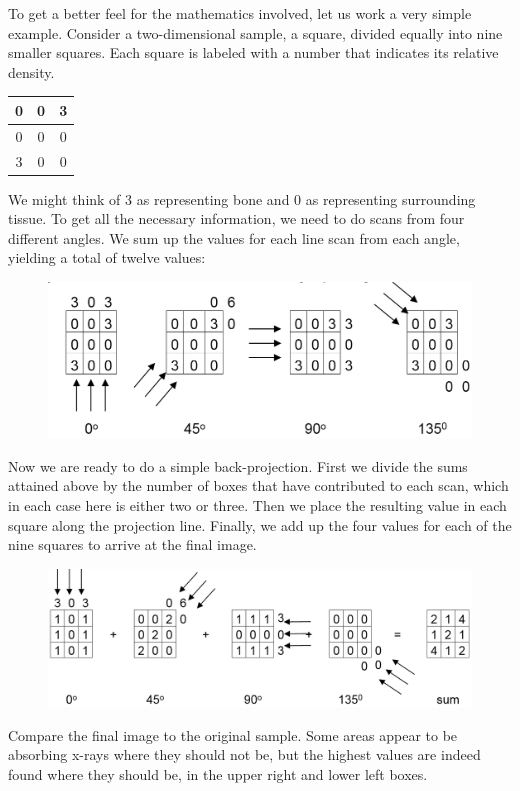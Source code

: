 To get a better feel for the mathematics involved, let us work a very simple example.  Consider a two-dimensional sample, a square, divided equally into nine smaller squares.  Each square is labeled with a number that indicates its relative density.
\begin{table}[!h]
\begin{center}
\begin{tabular}{|c|c|c|}
\hline
0 & 0 & 3\\
\hline
0 & 0 & 0\\
\hline
3 & 0 & 0\\
\hline
\end{tabular}
\label{table10-2}
\end{center}
\end{table}
We might think of 3 as representing bone and 0 as representing surrounding tissue. To get all the necessary information, we need to do scans from four different angles.  We sum up the values for each line scan from each angle, yielding a total of twelve values:  
\begin{figure}[!htb]
	\centering
	\includegraphics[width=\textwidth]{./figures/Topic10/CTExample1.png}
	\label{CTEx1}
\end{figure}
Now we are ready to do a simple back-projection.  First we divide the sums attained above by the number of boxes that have contributed to each scan, which in each case here is either two or three.  Then we place the resulting value in each square along the projection line. Finally, we add up the four values for each of the nine squares to arrive at the final image.  
\begin{figure}[!htb]
	\centering
	\includegraphics[width=\textwidth]{./figures/Topic10/CTExample2.png}
	\label{CTEx2}
\end{figure}
Compare the final image to the original sample.  Some areas appear to be absorbing x-rays where they should not be, but the highest values are indeed found where they should be, in the upper right and lower left boxes.

